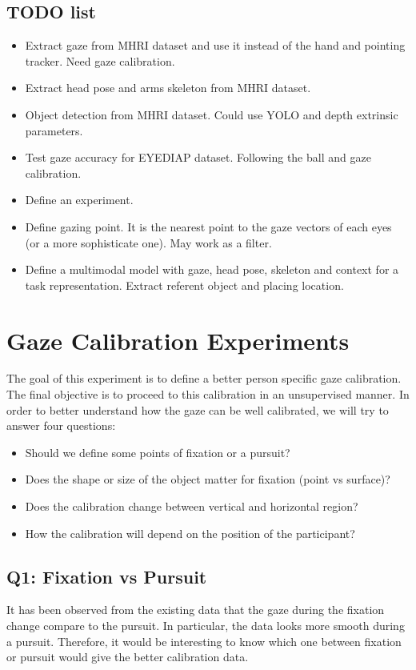 \documentclass[11pt,a4paper]{article}
\begin{document}
\subsection{TODO list}
\begin{itemize}
\item Extract gaze from MHRI dataset and use it instead of the hand and pointing tracker. Need gaze calibration.
\item Extract head pose and arms skeleton from MHRI dataset.
\item Object detection from MHRI dataset. Could use YOLO and depth extrinsic parameters.
\item Test gaze accuracy for EYEDIAP dataset. Following the ball and gaze calibration.
\item Define an experiment.
\item Define gazing point. It is the nearest point to the gaze vectors of each eyes (or a more sophisticate one). May work as a filter.
\item Define a multimodal model with gaze, head pose, skeleton and context for a task representation. Extract referent object and placing location.
\end{itemize}

\section{Gaze Calibration Experiments}
The goal of this experiment is to define a better person specific gaze calibration. The final objective is to proceed to this calibration in an unsupervised manner. In order to better understand how the gaze can be well calibrated, we will try to answer four questions:
\begin{itemize}
\item Should we define some points of fixation or a pursuit?
\item Does the shape or size of the object matter for fixation (point vs surface)?
\item Does the calibration change between vertical and horizontal region?
\item How the calibration will depend on the position of the participant?
\end{itemize}

\subsection{Q1: Fixation vs Pursuit}
It has been observed from the existing data that the gaze during the fixation change compare to the pursuit. In particular, the data looks more smooth during a pursuit. Therefore, it would be interesting to know which one between fixation or pursuit would give the better calibration data. 
\end{document}
